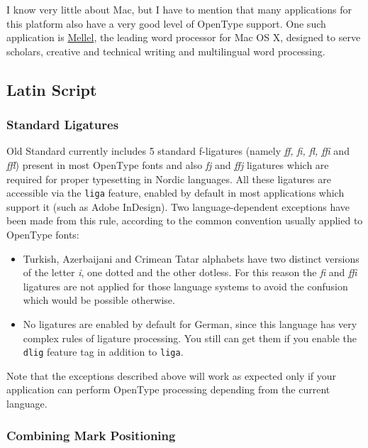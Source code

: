 \documentclass[12pt,a4paper,openany]{book}
\begin{document}
I know very little about Mac, but I have to mention that many applications for
this platform also have a very good level of OpenType support. One such
application is \href{http://www.redlers.com}{Mellel}, the leading word
processor for Mac OS X, designed to serve scholars, creative and technical
writing and multilingual word processing.

\subsection{Latin Script}

\subsubsection{Standard Ligatures}

Old Standard currently includes 5 standard f-ligatures (namely \textit{ff,
fi, fl, ffi} and \textit{ffl}) present in most OpenType fonts and also
\textit{fj} and \textit{ffj} ligatures which are required for proper
typesetting in Nordic languages. All these ligatures are accessible via the
\texttt{liga} feature, enabled by default in most applications which
support it (such as Adobe InDesign). Two language-dependent exceptions have
been made from this rule, according to the common convention usually
applied to OpenType fonts:

\begin{itemize}

\item Turkish, Azerbaijani and Crimean Tatar alphabets have two distinct
versions of the letter \textit{i}, one dotted and the other dotless. For
this reason the \textit{fi} and \textit{ffi} ligatures are not applied for
those language systems to avoid the confusion which would be possible
otherwise.

\item No ligatures are enabled by default for German, since this language
has very complex rules of ligature processing. You still can get them if
you enable the \texttt{dlig} feature tag in addition to \texttt{liga}.

\end{itemize}

Note that the exceptions described above will work as expected only if your
application can perform OpenType processing depending from the current
language.

\subsubsection{Combining Mark Positioning}
\hypertarget{mark}{}
\end{document}
